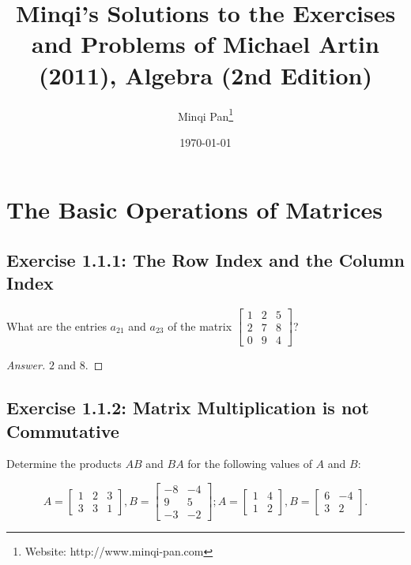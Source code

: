 \documentclass{amsbook}
\theoremstyle{definition}
\theoremstyle{remark}
\numberwithin{section}{chapter}
\numberwithin{equation}{chapter}
\begin{document}
\frontmatter

\title{Minqi's Solutions to the Exercises and Problems of Michael Artin (2011), Algebra (2nd Edition)}

\author{Minqi Pan\footnote{Website: http://www.minqi-pan.com}}

\date{\today}

\maketitle

\setcounter{page}{4}

\tableofcontents

\mainmatter

\chapter{The Basic Operations of Matrices}

\section{Exercise 1.1.1: The Row Index and the Column Index}

What are the entries $a_{21}$ and $a_{23}$ of the matrix $\begin{bmatrix}
1 & 2 & 5\\
2 & 7 & 8\\
0 & 9 & 4
\end{bmatrix}$?

\begin{proof}[Answer]
$2$ and $8$.
\end{proof}

\section{Exercise 1.1.2: Matrix Multiplication is not Commutative}

Determine the products $AB$ and $BA$ for the following values of $A$ and $B$:

\[ A=\begin{bmatrix}
1&2&3\\
3&3&1
\end{bmatrix}, B=\begin{bmatrix}
-8 & -4\\
9  & 5\\
-3 & -2\end{bmatrix}; A=\begin{bmatrix}
1&4\\
1&2\end{bmatrix}, B=\begin{bmatrix}
6 & -4\\
3 & 2\end{bmatrix}. \]
\end{document}
